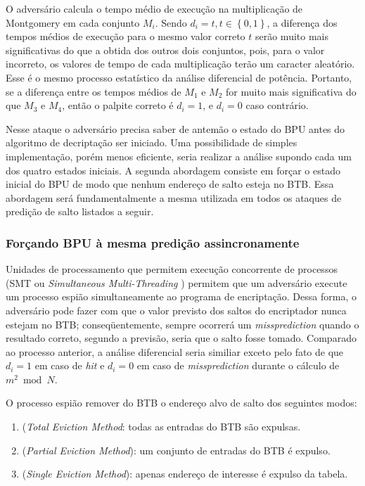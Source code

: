 O advers\'{a}rio calcula o tempo m\'{e}dio de execu\c{c}\~{a}o na multiplica\c{c}\~{a}o de Montgomery em cada conjunto $M_{i}$. Sendo $d_{i} = t, t \in \left\lbrace 0,1\right\rbrace $, a diferen\c{c}a dos tempos m\'{e}dios de execu\c{c}\~{a}o para o mesmo valor correto $t$ ser\~{a}o muito mais significativas do que a obtida dos outros dois conjuntos, pois, para o valor incorreto, os valores de tempo de cada multiplica\c{c}\~{a}o ter\~{a}o um caracter aleat\'{o}rio. Esse \'{e} o mesmo processo estat\'{i}stico da an\'{a}lise diferencial de pot\^{e}ncia. Portanto, se a diferen\c{c}a entre os tempos m\'{e}dios de $M_{1}$ e $M_{2}$ for muito mais significativa do que $M_{3}$ e $M_{4}$, ent\~{a}o o palpite correto \'{e} $d_{i} = 1$, e $d_{i} = 0$ caso contr\'{a}rio. 

Nesse ataque o advers\'{a}rio precisa saber de antem\~{a}o o estado do BPU antes do algoritmo de decripta\c{c}\~{a}o ser iniciado. Uma possibilidade de simples implementa\c{c}\~{a}o, por\'{e}m menos eficiente, seria realizar a an\'{a}lise supondo cada um dos quatro estados iniciais. A segunda abordagem consiste em for\c{c}ar o estado inicial do BPU de modo que nenhum endere\c{c}o de salto esteja no BTB. Essa abordagem ser\'{a} fundamentalmente a mesma utilizada em todos os ataques de predi\c{c}\~{a}o de salto listados a seguir.

\subsubsection*{For\c{c}ando BPU \`{a} mesma predi\c{c}\~{a}o assincronamente}

Unidades de processamento que permitem execu\c{c}\~{a}o concorrente de processos (SMT ou \textit{Simultaneous Multi-Threading} \cite{Silberschatz2004}) permitem que um advers\'{a}rio execute um processo espi\~{a}o simultaneamente ao programa de encripta\c{c}\~{a}o. Dessa forma, o advers\'{a}rio pode fazer com que o valor previsto dos saltos do encriptador nunca estejam no BTB; conseq\"{u}entemente, sempre ocorrer\'{a} um \textit{missprediction} quando o resultado correto, segundo a previs\~{a}o, seria que o salto fosse tomado. Comparado ao processo anterior, a an\'{a}lise diferencial seria similiar exceto pelo fato de que $d_{i} = 1$ em caso de \textit{hit} e $d_{i} = 0$ em caso de \textit{missprediction} durante o c\'{a}lculo de $m^{2} \bmod N$.

O processo espi\~{a}o remover do BTB o endere\c{c}o alvo de salto dos seguintes modos:
\begin{enumerate}
	\item (\textit{Total Eviction Method}: todas as entradas do BTB s\~{a}o expulsas.
	\item (\textit{Partial Eviction Method}): um conjunto de entradas do BTB \'{e} expulso.
	\item (\textit{Single Eviction Method}): apenas endere\c{c}o de interesse \'{e} expulso da tabela.
\end{enumerate}

